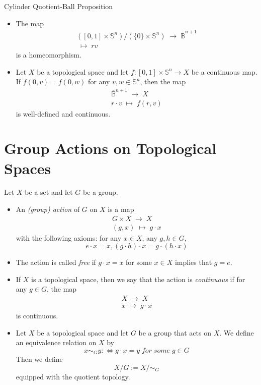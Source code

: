 \begin{proposition}{Cylinder Quotient-Ball Proposition}\\
\begin{itemize}
    \item The map
    $$\substack{([0,1] \times \mathbb{S}^n)/(\{0\} \times \mathbb{S}^n) \;\to\;\overline{\mathbb{B}}^{n+1}\\
    [(r,v)] \;\mapsto\; rv}$$
    is a homeomorphism.
    \item Let $X$ be a topological space and let $f: [0,1] \times \mathbb{S}^n \to X$ be a continuous map. If $f(0,v) = f(0,w)$ for any $v,w \in \mathbb{S}^n$, then the map
    $$\substack{\overline{\mathbb{B}}^{n+1} \;\to\; X\\
    r\cdot v\;\mapsto\; f(r,v)}$$
    is well-defined and continuous.
\end{itemize}
\end{proposition}

\section{Group Actions on Topological Spaces}

\begin{definition}
    Let $X$ be a set and let $G$ be a group.
    \begin{itemize}
        \item An \textit{(group) action} of $G$ on $X$ is a map
        $$\substack{G \times X \;\to\; X\\
        (g,x) \;\mapsto\; g\cdot x}$$
        with the following axioms: for any $x \in X$, any $g,h \in G$,
        $$e \cdot x =x, (g\cdot h) \cdot x= g \cdot (h\cdot x)$$

        \item The action is called \textit{free} if $g\cdot x =x$ for some $x \in X$ implies that $g=e$.

        \item If $X$ is a topological space, then we say that the action is \textit{continuous} if for any $g\in G$, the map
        $$\substack{X \;\to\; X\\
        x \;\mapsto\; g \cdot x}$$
        is continuous.

        \item Let $X$ be a topological space and let $G$ be a group that acts on $X$. We define an equivalence relation on $X$ by
        $$x \sim_G y :\Leftrightarrow g \cdot x=y \;for\;some\;g \in G$$
        Then we define
        $$X/G := X/\sim_G$$
        equipped with the quotient topology.
    \end{itemize}
\end{definition}

